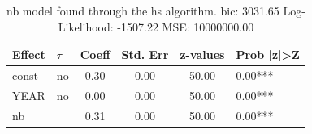 \begin{table}
	\caption{nb model found through the hs algorithm. bic: 3031.65 Log-Likelihood: -1507.22 MSE: 10000000.00}
	\begin{center}
		\begin{tabular}{|l|l|c|c|c|l|}
			\hline
			Effect & $\tau$ & Coeff & Std. Err & z-values & Prob |z|>Z \\
			\hline
			const & no & 0.30 & 0.00 & 50.00 & 0.00*** \\
			\hline
			YEAR & no & 0.00 & 0.00 & 50.00 & 0.00*** \\
			\hline
			nb &  & 0.31 & 0.00 & 50.00 & 0.00*** \\
			\hline
		\end{tabular}
	\end{center}
\end{table}